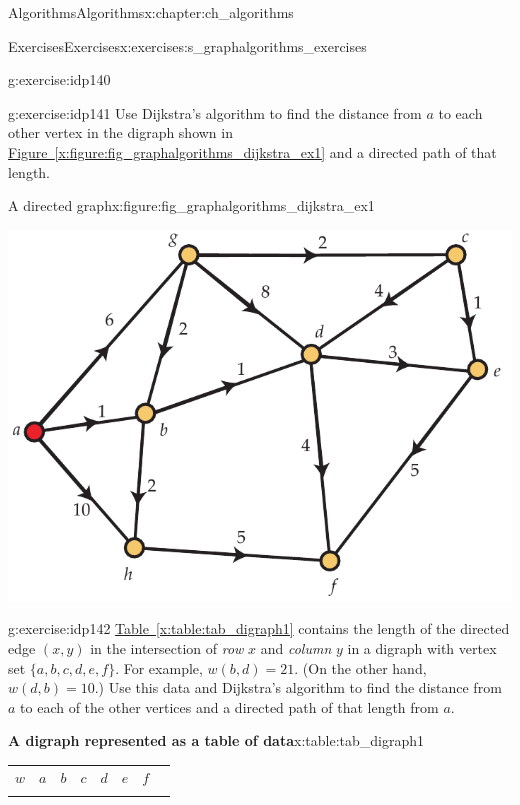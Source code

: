 \documentclass[oneside,10pt,]{book}
\newcommand{\tabularfont}{\relax}
\newcommand{\xreffont}{\relax}
\numberwithin{equation}{section}
\newcommand{\hrulethin}  {\noalign{\hrule height 0.04em}}
\begin{document}
\begin{chapterptx}{Algorithms}{}{Algorithms}{}{}{x:chapter:ch_algorithms}
\begin{exercises-section}{Exercises}{}{Exercises}{}{}{x:exercises:s_graphalgorithms_exercises}
\begin{divisionexercise}{10}{}{}{g:exercise:idp140}
\end{divisionexercise}%
\begin{divisionexercise}{11}{}{}{g:exercise:idp141}%
Use Dijkstra's algorithm to find the distance from \(a\) to each other vertex in the digraph shown in \hyperref[x:figure:fig_graphalgorithms_dijkstra_ex1]{Figure~{\xreffont\ref{x:figure:fig_graphalgorithms_dijkstra_ex1}}} and a directed path of that length.%
\begin{figureptx}{A directed graph}{x:figure:fig_graphalgorithms_dijkstra_ex1}{}%
\begin{image}{0.175}{0.65}{0.175}%
\includegraphics[width=\linewidth]{images/dijkstra_ex1}
\end{image}%
\tcblower
\end{figureptx}%
\end{divisionexercise}%
\begin{divisionexercise}{12}{}{}{g:exercise:idp142}%
\hyperref[x:table:tab_digraph1]{Table~{\xreffont\ref{x:table:tab_digraph1}}} contains the length of the directed edge \((x,y)\) in the intersection of \emph{row} \(x\) and \emph{column} \(y\) in a digraph with vertex set \(\{a,b,c,d,e,f\}\). For example, \(w(b,d)=21\). (On the other hand, \(w(d,b)=10\).) Use this data and Dijkstra's algorithm to find the distance from \(a\) to each of the other vertices and a directed path of that length from \(a\).%
\begin{tableptx}{\textbf{A digraph represented as a table of data}}{x:table:tab_digraph1}{}%
\centering%
{\tabularfont%
\begin{tabular}{lAllllll}
\(w\)&\(a\)&\(b\)&\(c\)&\(d\)&\(e\)&\(f\)\tabularnewline\hrulethin

\end{tabular}}
\end{tableptx}
\end{divisionexercise}
\end{exercises-section}
\end{chapterptx}
\end{document}
